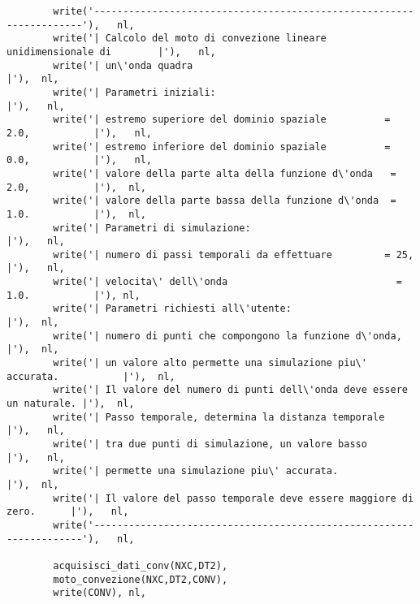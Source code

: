 \begin{verbatim}
        write('--------------------------------------------------------------------'),   nl,
        write('| Calcolo del moto di convezione lineare unidimensionale di        |'),   nl,
        write('| un\'onda quadra                                                   |'),  nl,
        write('| Parametri iniziali:                                              |'),   nl,
        write('| estremo superiore del dominio spaziale          = 2.0,           |'),   nl,
        write('| estremo inferiore del dominio spaziale          = 0.0,           |'),   nl, 
        write('| valore della parte alta della funzione d\'onda   = 2.0,           |'),  nl, 
        write('| valore della parte bassa della funzione d\'onda  = 1.0.           |'),  nl,
        write('| Parametri di simulazione:                                        |'),   nl,
        write('| numero di passi temporali da effettuare         = 25,            |'),   nl, 
        write('| velocita\' dell\'onda                             = 1.0.           |'), nl, 
        write('| Parametri richiesti all\'utente:                                  |'),  nl, 
        write('| numero di punti che compongono la funzione d\'onda,               |'),  nl,
        write('| un valore alto permette una simulazione piu\' accurata.           |'),  nl,
        write('| Il valore del numero di punti dell\'onda deve essere un naturale. |'),  nl,
        write('| Passo temporale, determina la distanza temporale                 |'),   nl,
        write('| tra due punti di simulazione, un valore basso                    |'),   nl,
        write('| permette una simulazione piu\' accurata.                          |'),  nl,
        write('| Il valore del passo temporale deve essere maggiore di zero.      |'),   nl,
        write('--------------------------------------------------------------------'),   nl,

        acquisisci_dati_conv(NXC,DT2),                                                 
        moto_convezione(NXC,DT2,CONV), 
        write(CONV), nl,


\end{verbatim}
